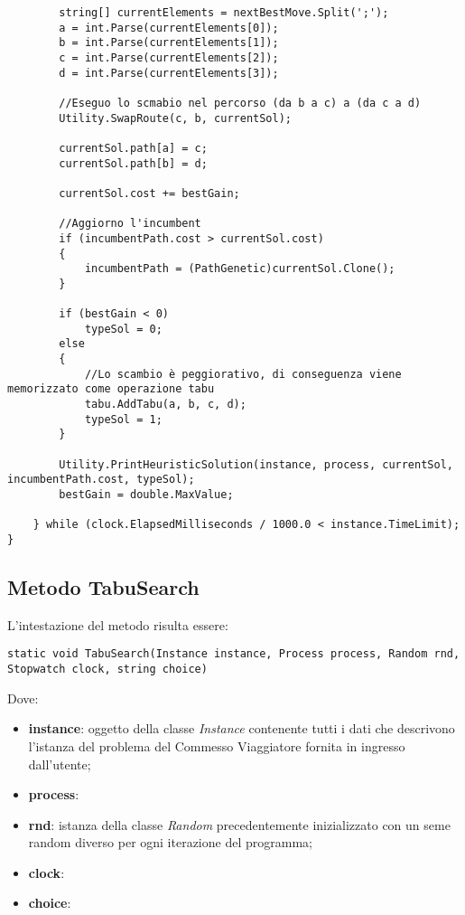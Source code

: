 \begin{lstlisting}
        string[] currentElements = nextBestMove.Split(';');
        a = int.Parse(currentElements[0]);
        b = int.Parse(currentElements[1]);
        c = int.Parse(currentElements[2]);
        d = int.Parse(currentElements[3]);
        
        //Eseguo lo scmabio nel percorso (da b a c) a (da c a d)
        Utility.SwapRoute(c, b, currentSol);
        
        currentSol.path[a] = c;
        currentSol.path[b] = d;
        
        currentSol.cost += bestGain;
        
        //Aggiorno l'incumbent
        if (incumbentPath.cost > currentSol.cost)
        {
            incumbentPath = (PathGenetic)currentSol.Clone();
        }
        
        if (bestGain < 0)
            typeSol = 0;
        else
        {
            //Lo scambio è peggiorativo, di conseguenza viene memorizzato come operazione tabu
            tabu.AddTabu(a, b, c, d);
            typeSol = 1;
        }
        
        Utility.PrintHeuristicSolution(instance, process, currentSol, incumbentPath.cost, typeSol);
        bestGain = double.MaxValue;
    
    } while (clock.ElapsedMilliseconds / 1000.0 < instance.TimeLimit);
}
\end{lstlisting}

\subsection{Metodo TabuSearch}

L'intestazione del metodo risulta essere:

\begin{lstlisting}
static void TabuSearch(Instance instance, Process process, Random rnd, Stopwatch clock, string choice)
\end{lstlisting}

Dove:

\begin{itemize}
    \item \textbf{instance}: oggetto della classe \textit{Instance} contenente tutti i dati che descrivono l'istanza del problema del Commesso Viaggiatore fornita in ingresso dall'utente;
    \item \textbf{process}: 
    \item \textbf{rnd}: istanza della classe \textit{Random} precedentemente inizializzato con un seme random diverso per ogni iterazione del programma;
    \item \textbf{clock}: 
    \item \textbf{choice}:
\end{itemize}

